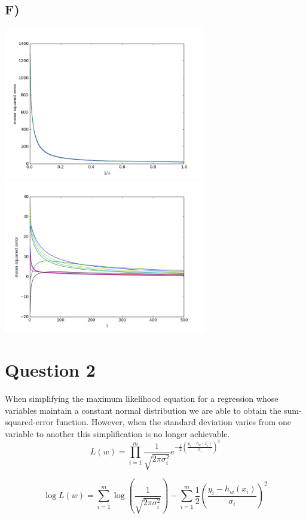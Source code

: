\documentclass{report}
\begin{document}
\subsection*{F)}
\includegraphics[width=250pt, keepaspectratio=true]{error.png}
\includegraphics[width=250pt, keepaspectratio=true]{weights.png}

\section*{Question 2}
When simplifying the maximum likelihood equation for a regression whose variables
maintain a constant normal distribution we are able to obtain the sum-squared-error
function. However, when the standard deviation varies from one variable to another
this simplification is no longer achievable.
  \begin{equation}
     L(w) = \prod_{i=1}^{m} \frac{1}{\sqrt{2\pi\sigma_i^2}}e ^ {-\frac{1}{2}\left(\frac{y_i-h_w(x_i)}{\sigma_i}\right)^2}
  \end{equation}

  \begin{equation}
     \log L(w) = \sum_{i=1}^{m} \log \left(\frac{1}{\sqrt{2\pi\sigma_i^2}}\right)
     - \sum_{i=1}^{m} \frac{1}{2}\left(\frac{y_i-h_w(x_i)}{\sigma_i}\right)^2
  \end{equation}
\end{document}

